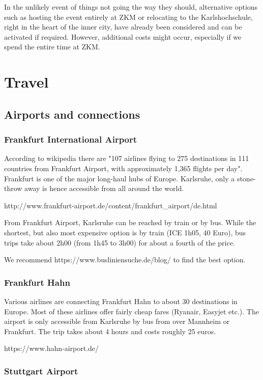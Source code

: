 In the unlikely event of things not going the way they should, alternative options such as hosting the event entirely at ZKM or relocating to the Karlshochschule, right in the heart of the inner city, have already been considered and can be activated if required. However, additional costs might occur, especially if we spend the entire time at ZKM. 

\section{Travel}

\subsection{Airports and connections}

\subsubsection{Frankfurt International Airport}

According to wikipedia there are "107 airlines flying to 275 destinations in 111 countries from Frankfurt Airport, with approximately 1,365 flights per day". Frankfurt is one of the major long-haul hubs of Europe. Karlsruhe, only a stone-throw away is hence accessible from all around the world.

http://www.frankfurt-airport.de/content/frankfurt_airport/de.html

From Frankfurt Airport, Karlsruhe can be reached by train or by bus. While the shortest, but also most expensive option is by train (ICE 1h05, 40 Euro), bus trips take about 2h00 (from 1h45 to 3h00) for about a fourth of the price.

We recommend https://www.busliniensuche.de/blog/ to find the best option.

\subsubsection{Frankfurt Hahn}

Various airlines are connecting Frankfurt Hahn to about 30 destinations in Europe. Most of these airlines offer fairly cheap fares (Ryanair, Easyjet etc.). The airport is only accessible from Karlsruhe by bus from over Mannheim or Frankfurt. The trip takes about 4 hours and costs roughly 25 euros.

https://www.hahn-airport.de/

\subsubsection{Stuttgart Airport}

